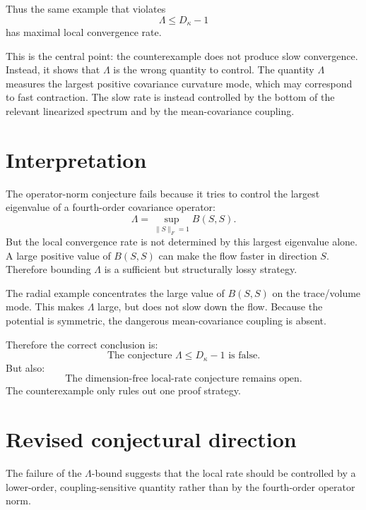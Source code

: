 \documentclass[11pt]{article}
\numberwithin{equation}{section}
\begin{document}
Thus the same example that violates
\begin{equation}
    \Lambda\le D_\kappa-1
\end{equation}
has maximal local convergence rate.

This is the central point: the counterexample does not produce slow convergence. 
Instead, it shows that $\Lambda$ is the wrong quantity to control. 
The quantity $\Lambda$ measures the largest positive covariance curvature mode, which may correspond to fast contraction. 
The slow rate is instead controlled by the bottom of the relevant linearized spectrum and by the mean-covariance coupling.

\section{Interpretation}

The operator-norm conjecture fails because it tries to control the largest eigenvalue of a fourth-order covariance operator:
\begin{equation}
    \Lambda=\sup_{\|S\|_F=1}B(S,S).
\end{equation}
But the local convergence rate is not determined by this largest eigenvalue alone. 
A large positive value of $B(S,S)$ can make the flow faster in direction $S$. 
Therefore bounding $\Lambda$ is a sufficient but structurally lossy strategy.

The radial example concentrates the large value of $B(S,S)$ on the trace/volume mode. 
This makes $\Lambda$ large, but does not slow down the flow. 
Because the potential is symmetric, the dangerous mean-covariance coupling is absent.

Therefore the correct conclusion is:
\begin{equation}
    \boxed{
    \text{The conjecture } \Lambda\le D_\kappa-1 \text{ is false.}
    }
\end{equation}
But also:
\begin{equation}
    \boxed{
    \text{The dimension-free local-rate conjecture remains open.}
    }
\end{equation}
The counterexample only rules out one proof strategy.

\section{Revised conjectural direction}

The failure of the $\Lambda$-bound suggests that the local rate should be controlled by a lower-order, coupling-sensitive quantity rather than by the fourth-order operator norm.
\end{document}
